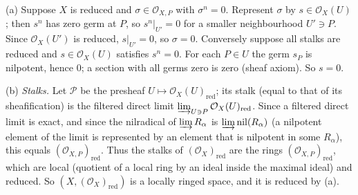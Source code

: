 \documentclass[11pt]{article}
\begin{document}
\pf
(a) Suppose $X$ is reduced and $\sigma\in\mathcal O_{X,P}$ with $\sigma^n=0$. Represent $\sigma$ by $s\in\mathcal O_X(U)$; then $s^n$ has zero germ at $P$, so $s^n|_{U'}=0$ for a smaller neighbourhood $U'\ni P$. Since $\mathcal O_X(U')$ is reduced, $s|_{U'}=0$, so $\sigma=0$. Conversely suppose all stalks are reduced and $s\in\mathcal O_X(U)$ satisfies $s^n=0$. For each $P\in U$ the germ $s_P$ is nilpotent, hence $0$; a section with all germs zero is zero (sheaf axiom). So $s=0$.

(b) \emph{Stalks.} Let $\mathcal P$ be the presheaf $U\mapsto\mathcal O_X(U)_{\mathrm{red}}$; its stalk (equal to that of its sheafification) is the filtered direct limit $\varinjlim_{U\ni P}\mathcal O_X(U)_{\mathrm{red}}$. Since a filtered direct limit is exact, and since the nilradical of $\varinjlim R_\alpha$ is $\varinjlim\mathrm{nil}(R_\alpha)$ (a nilpotent element of the limit is represented by an element that is nilpotent in some $R_\alpha$), this equals $(\mathcal O_{X,P})_{\mathrm{red}}$. Thus the stalks of $(\mathcal O_X)_{\mathrm{red}}$ are the rings $(\mathcal O_{X,P})_{\mathrm{red}}$, which are local (quotient of a local ring by an ideal inside the maximal ideal) and reduced. So $(X,(\mathcal O_X)_{\mathrm{red}})$ is a locally ringed space, and it is reduced by (a).
\end{document}
